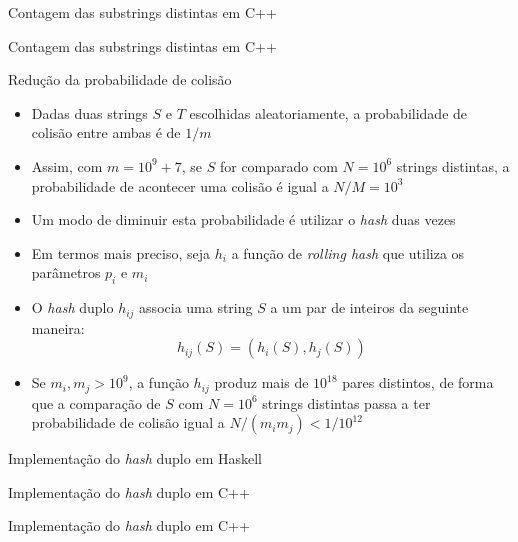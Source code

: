 \begin{frame}[fragile]{Contagem das substrings distintas em C++}
\end{frame}

\begin{frame}[fragile]{Contagem das substrings distintas em C++}
\end{frame}

\begin{frame}[fragile]{Redução da probabilidade de colisão}

    \begin{itemize}
        \item Dadas duas strings $S$ e $T$ escolhidas aleatoriamente, a probabilidade de
            colisão entre ambas é de $1/m$

        \item Assim, com $m = 10^9 + 7$, se $S$ for comparado com $N = 10^6$ strings distintas,
            a probabilidade de acontecer uma colisão é igual a $N/M = 10^3$

        \item Um modo de diminuir esta probabilidade é utilizar o \textit{hash} duas vezes

        \item Em termos mais preciso, seja $h_i$ a função de \textit{rolling hash} que utiliza
            os parâmetros $p_i$ e $m_i$

        \item O \textit{hash} duplo $h_{ij}$ associa uma string $S$ a um par de inteiros da 
            seguinte maneira:
            \[
                h_{ij}(S) = (h_i(S), h_j(S))
            \]

        \item Se $m_i, m_j > 10^9$, a função $h_{ij}$ produz mais de $10^{18}$ pares distintos,
            de forma que a comparação de $S$ com $N = 10^6$ strings distintas passa a ter
            probabilidade de colisão igual a $N/(m_im_j) < 1/10^{12}$
    \end{itemize}

\end{frame}

\begin{frame}[fragile]{Implementação do {\it hash} duplo em Haskell}
\end{frame}

\begin{frame}[fragile]{Implementação do {\it hash} duplo em C++}
\end{frame}

\begin{frame}[fragile]{Implementação do {\it hash} duplo em C++}
\end{frame}
